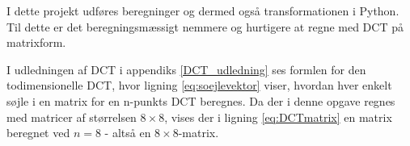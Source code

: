 I dette projekt udføres beregninger og dermed også transformationen i Python. Til dette er det beregningsmæssigt nemmere og hurtigere at regne med DCT på matrixform.

I udledningen af DCT i appendiks \vref{DCT_udledning} ses formlen for den todimensionelle DCT, hvor ligning \vref{eq:soejlevektor} viser, hvordan hver enkelt søjle i en matrix for en n-punkts DCT beregnes. Da der i denne opgave regnes med matricer af størrelsen $8 \times 8$, vises der i ligning \ref{eq:DCTmatrix} en matrix beregnet ved $n=8$ - altså en $8 \times 8$-matrix.
